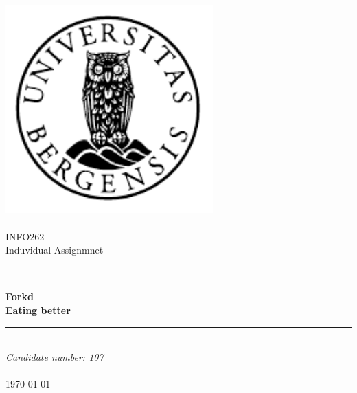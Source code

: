 \documentclass[12pt]{article}
\renewcommand{\maketitle}{}
\begin{document}
\maketitle

\newcommand{\blankpage}{\newpage{}\thispagestyle{empty}\mbox{}\newpage{}}
\newcommand{\HRule}{\rule{\linewidth}{0.5mm}}

\begin{titlepage}
\begin{center}
\includegraphics[width=8cm]{pictures/uib-emblem-svart} \\[0.5cm]
\paragraph*{}

\textsc{\Large INFO262 }\\[0.5cm]
\Large Induvidual Assignmnet\\[0.4cm]
\HRule \\[0.4cm]
{\huge \bfseries Forkd \\ Eating better}\\[0.5cm]
\HRule \\[1.0cm]

\emph{Candidate number: 107}\\

\paragraph*{}
\end{center}
\vfill
\begin{center}
{\large \today}
\end{center}
\end{titlepage}

\setcounter{tocdepth}{3}
\tableofcontents
\end{document}
